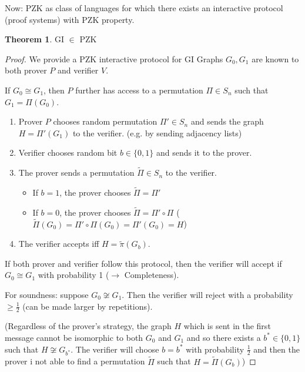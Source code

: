 \documentclass[11pt]{article}
\theoremstyle{definition}
\newtheorem{theorem}{Theorem}[section]
\theoremstyle{definition}
\begin{document}
Now: PZK as class of languages for which there exists an interactive protocol (proof systems) with PZK property.

\begin{theorem} GI $ \in $ PZK 
\end{theorem}

\begin{proof}

We provide a PZK interactive protocol for GI Graphs $ G_0, G_1 $ are known to both prover $ P $ and verifier $ V $.

If $ G_0 \cong G_1 $, then $ P $ further has access to a permutation $ \Pi \in S_n $ such that $ G_1 = \Pi (G_0 ) $.

\begin{enumerate}
\item Prover $ P $ chooses random permutation $ \Pi' \in S_n $ and sends the graph $ H = \Pi' (G_1) $ to the verifier. (e.g. by sending adjacency lists)
\item Verifier chooses random bit $ b \in \{0, 1\} $ and sends it to the prover.
\item The prover sends a permutation $ \tilde \Pi \in S_n $ to the verifier.
	\begin{itemize}
	\item If $ b = 1 $, the prover chooses $ \tilde \Pi = \Pi' $
	\item If $ b = 0 $, the prover chooses $ \tilde \Pi = \Pi' \circ \Pi $ ($ \tilde \Pi(G_0) = \Pi' \circ \Pi(G_0) = \Pi' (G_0 ) = H $)
	\end{itemize}

\item The verifier accepts iff $ H = \tilde \pi (G_b) $.
\end{enumerate}

If both prover and verifier follow this protocol, then the verifier will accept if $ G_0 \cong G_1 $ with probability 1 ($ \rightarrow $ Completeness).

For soundness: suppose $ G_0 \not \cong G_1 $. Then the verifier will reject with a probability $ \geq \frac{1}{2} $ (can be made larger by repetitions).

(Regardless of the prover's strategy, the graph $ H $ which is sent in the first message cannot be isomorphic to both $ G_0 $ and $ G_1 $ and so there exists a $ b^\ast \in \{ 0, 1 \} $ such that $ H \not \cong G_{b^\ast} $. The verifier will choose $ b = b^\ast $ with probability $ \frac{1}{2} $ and then the prover i not able to find a permutation $ \tilde \Pi $ such that $ H = \tilde \Pi (G_b) $)
\end{proof}
\end{document}
